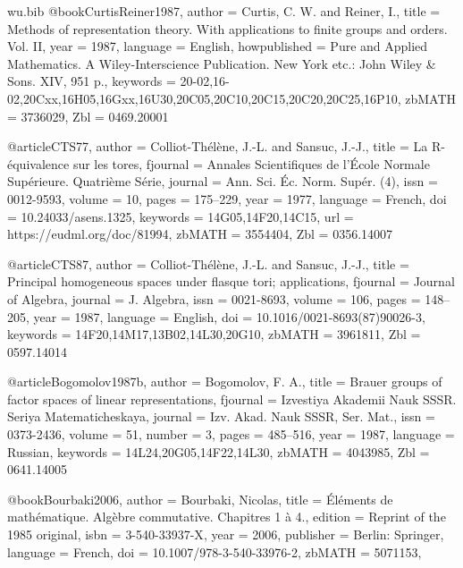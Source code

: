 \documentclass[12pt,a4paper]{article}
\theoremstyle{definition}
\begin{document}
\begin{filecontents}{wu.bib}
@book{CurtisReiner1987,
    author = {Curtis, C. W. and Reiner, I.},
title = {Methods of representation theory. {With} applications to finite groups
and orders. {Vol}. {II}}, year = {1987}, language = {English}, howpublished =
{Pure and Applied Mathematics. A Wiley-Interscience Publication. New York etc.:
John Wiley \& Sons. XIV, 951 p.}, keywords =
{20-02,16-02,20Cxx,16H05,16Gxx,16U30,20C05,20C10,20C15,20C20,20C25,16P10},
zbMATH = {3736029}, Zbl = {0469.20001} }

@article{CTS77,
	author = {Colliot-Th{\'e}l{\`e}ne, J.-L. and Sansuc, J.-J.},
	title = {La {R}-{\'e}quivalence sur les tores},
fjournal = {Annales Scientifiques de l'{\'E}cole Normale Sup{\'e}rieure.
Quatri{\`e}me S{\'e}rie}, journal = {Ann. Sci. {\'E}c. Norm. Sup{\'e}r. (4)},
issn = {0012-9593}, volume = {10}, pages = {175--229}, year = {1977}, language =
{French}, doi = {10.24033/asens.1325}, keywords = {14G05,14F20,14C15}, url =
{https://eudml.org/doc/81994}, zbMATH = {3554404}, Zbl = {0356.14007} }
	
@article{CTS87,
	author = {Colliot-Th{\'e}l{\`e}ne, J.-L. and Sansuc, J.-J.},
	title = {Principal homogeneous spaces under flasque tori; applications},
	fjournal = {Journal of Algebra},
	journal = {J. Algebra},
	issn = {0021-8693},
	volume = {106},
	pages = {148--205},
	year = {1987},
	language = {English},
	doi = {10.1016/0021-8693(87)90026-3},
	keywords = {14F20,14M17,13B02,14L30,20G10},
	zbMATH = {3961811},
	Zbl = {0597.14014}
}


@article{Bogomolov1987b,
	author = {Bogomolov, F. A.},
	title = {Brauer groups of factor spaces of linear representations},
	fjournal = {Izvestiya Akademii Nauk SSSR. Seriya Matematicheskaya},
	journal = {Izv. Akad. Nauk SSSR, Ser. Mat.},
	issn = {0373-2436},
	volume = {51},
	number = {3},
	pages = {485--516},
	year = {1987},
	language = {Russian},
	keywords = {14L24,20G05,14F22,14L30},
	zbMATH = {4043985},
	Zbl = {0641.14005}
}

@book{Bourbaki2006,
	author = {Bourbaki, Nicolas},
title = {{\'E}l{\'e}ments de math{\'e}matique. {Alg{\`e}bre} commutative.
{Chapitres} 1 {\`a} 4.}, edition = {Reprint of the 1985 original}, isbn =
{3-540-33937-X}, year = {2006}, publisher = {Berlin: Springer}, language =
{French}, doi = {10.1007/978-3-540-33976-2}, zbMATH = {5071153}, }


\end{filecontents}
\end{document}
